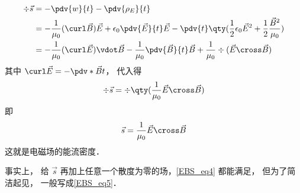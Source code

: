 \begin{equation}
\begin{aligned}
\div \vec s &=  - \pdv{w}{t} - \pdv{\rho_E}{t}\\
&= -\frac{1}{\mu_0} (\curl \vec B)\vec E + \epsilon_0 \pdv{\vec E}{t} \vec E - \pdv{t} \qty(\frac12 \epsilon_0 \vec E^2 + \frac12 \frac{\vec B^2}{\mu_0})\\
&=  - \frac{1}{\mu_0} (\curl \vec E) \vdot \vec B - \frac{1}{\mu_0}\pdv{\vec B}{t} \vec B + \frac{1}{\mu_0}\div (\vec E \cross \vec B)
\end{aligned}
\end{equation} 
其中 $\curl \vec E =  -\pdv*{\vec B}{t}$， 代入得
\begin{equation}\label{EBS_eq4}
\div \vec s = \div \qty(\frac{1}{\mu_0}\vec E \cross \vec B)
\end{equation} 
即
\begin{equation}\label{EBS_eq5}
\vec s = \frac{1}{\mu_0}\vec E \cross \vec B
\end{equation} 
这就是电磁场的能流密度．

事实上， 给 $\vec s$ 再加上任意一个散度为零的场，\autoref{EBS_eq4} 都能满足， 但为了简洁起见， 一般写成\autoref{EBS_eq5}． 





